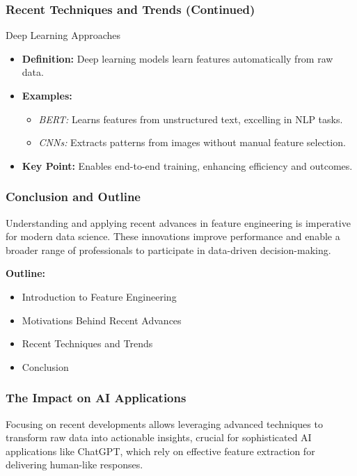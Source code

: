 \documentclass[aspectratio=169]{beamer}
\begin{document}
\begin{frame}[fragile]
    \frametitle{Recent Techniques and Trends (Continued)}
    \begin{block}{Deep Learning Approaches}
        \begin{itemize}
            \item \textbf{Definition:} Deep learning models learn features automatically from raw data.
            \item \textbf{Examples:}
            \begin{itemize}
                \item \textit{BERT:} Learns features from unstructured text, excelling in NLP tasks.
                \item \textit{CNNs:} Extracts patterns from images without manual feature selection.
            \end{itemize}
            \item \textbf{Key Point:} Enables end-to-end training, enhancing efficiency and outcomes.
        \end{itemize}
    \end{block}
\end{frame}

\begin{frame}[fragile]
    \frametitle{Conclusion and Outline}
    Understanding and applying recent advances in feature engineering is imperative for modern data science. These innovations improve performance and enable a broader range of professionals to participate in data-driven decision-making.

    \textbf{Outline:}
    \begin{itemize}
        \item Introduction to Feature Engineering
        \item Motivations Behind Recent Advances
        \item Recent Techniques and Trends
        \item Conclusion
    \end{itemize}
\end{frame}

\begin{frame}[fragile]
    \frametitle{The Impact on AI Applications}
    Focusing on recent developments allows leveraging advanced techniques to transform raw data into actionable insights, crucial for sophisticated AI applications like ChatGPT, which rely on effective feature extraction for delivering human-like responses.
\end{frame}
\end{document}
